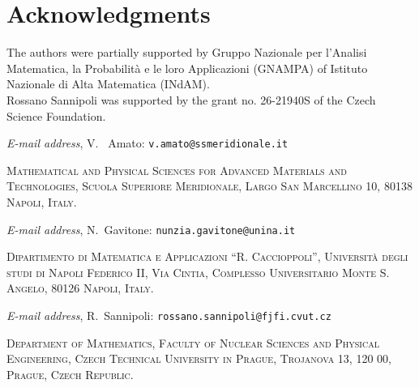 \documentclass[oneside,a4paper,11pt,notitlepage]{article}
\makeatletter
\theoremstyle{definition}
\theoremstyle{plain}
\theoremstyle{definition}
\newcommand{\Addresses}{{%
  \bigskip 
   \footnotesize 
 \noindent \textit{E-mail address}, V.~ Amato: \texttt{v.amato@ssmeridionale.it} 
  
   \medskip 
 
  \noindent\textsc{Mathematical and Physical Sciences for Advanced Materials and Technologies, Scuola Superiore Meridionale, Largo San Marcellino 10, 80138 Napoli, Italy. } 
 
 
 \medskip 
 

 \noindent  \textit{E-mail address}, N.~Gavitone: \texttt{nunzia.gavitone@unina.it} 
   
 \medskip
\noindent  \textsc{Dipartimento di Matematica e Applicazioni ``R. Caccioppoli'', Universit\`a degli studi di Napoli Federico II, Via Cintia, Complesso Universitario Monte S. Angelo, 80126 Napoli, Italy.}
  \medskip
 
 \noindent \textit{E-mail address}, R.~Sannipoli: \texttt{rossano.sannipoli@fjfi.cvut.cz} 
  
     \medskip 
\noindent\textsc{Department of Mathematics, Faculty of Nuclear Sciences and Physical Engineering, Czech Technical University in Prague, Trojanova 13, 120 00, Prague, Czech Republic.}


\par\nopagebreak 

}}
\makeatother
\begin{document}
\section*{Acknowledgments}

The authors were partially supported by Gruppo Nazionale per l’Analisi Matematica, la Probabilità e le loro Applicazioni
(GNAMPA) of Istituto Nazionale di Alta Matematica (INdAM).\\
Rossano Sannipoli was supported by the grant no. 26-21940S
of the Czech Science Foundation.



\Addresses
 
\end{document}
